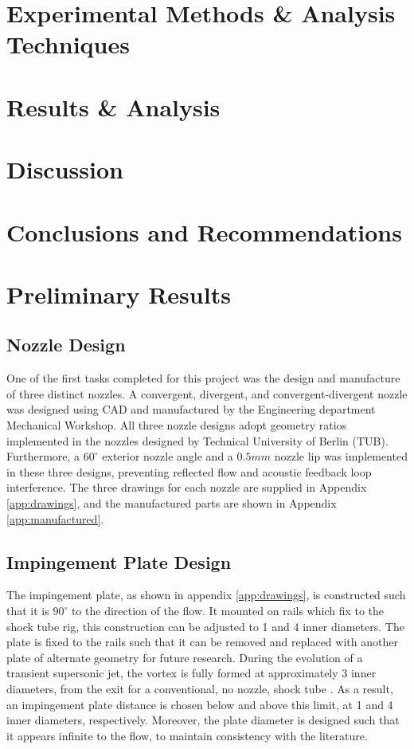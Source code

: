 \newpage
\section{Experimental Methods \& Analysis Techniques}

\newpage
\section{Results \& Analysis}

\newpage
\section{Discussion}

\newpage
\section{Conclusions and Recommendations}

\newpage
\section{Preliminary Results}

\subsection{Nozzle Design}

One of the first tasks completed for this project was the design and manufacture of three distinct nozzles. A convergent, divergent, and convergent-divergent nozzle was designed using CAD and manufactured by the Engineering department Mechanical Workshop. All three nozzle designs adopt geometry ratios implemented in the nozzles designed by Technical University of Berlin (TUB). Furthermore, a $60^\circ$ exterior nozzle angle and a $0.5mm$ nozzle lip was implemented in these three designs, preventing reflected flow and acoustic feedback loop interference. The three drawings for each nozzle are supplied in Appendix \ref{app:drawings}, and the manufactured parts are shown in Appendix \ref{app:manufactured}.

\subsection{Impingement Plate Design}
The impingement plate, as shown in appendix \ref{app:drawings}, is constructed such that it is $90^{\circ}$ to the direction of the flow. It mounted on rails which fix to the shock tube rig, this construction can be adjusted to 1 and 4 inner diameters. The plate is fixed to the rails such that it can be removed and replaced with another plate of alternate geometry for future research. During the evolution of a transient supersonic jet, the vortex is fully formed at approximately 3 inner diameters, from the exit for a conventional, no nozzle, shock tube \cite{mariani2013a}. As a result, an impingement plate distance is chosen below and above this limit, at 1 and 4 inner diameters, respectively. Moreover, the plate diameter is designed such that it appears infinite to the flow, to maintain consistency with the literature.

